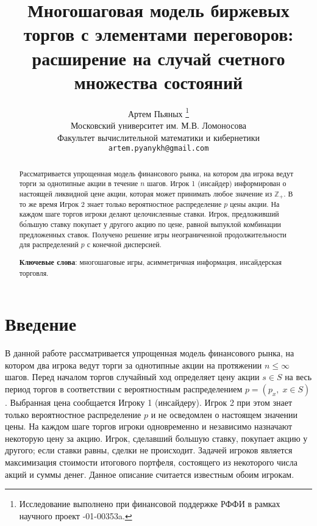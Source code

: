 \documentclass[12pt, draft]{extarticle}
\begin{document}
\title{Многошаговая модель биржевых торгов с элементами переговоров: расширение
  на случай счетного множества состояний%
}%
\author{%
  Артем Пьяных%
  \thanks{%
    Исследование выполнено при финансовой поддержке РФФИ в рамках научного
    проект -01-00353a.%
  }\\
  Московский университет им. М.В. Ломоносова\\
  Факультет вычислительной математики и кибернетики\\
  \texttt{artem.pyanykh@gmail.com}%
}%
\maketitle

\begin{abstract}
  Рассматривается упрощенная модель финансового рынка, на котором два игрока
  ведут торги за однотипные акции в течение $n$ шагов. Игрок 1 (инсайдер)
  информирован о настоящей ликвидной цене акции, которая может принимать любое
  значение из $\mathbb{Z}_+$. В то же время Игрок 2 знает только вероятностное
  распределение $p$ цены акции. На каждом шаге торгов игроки делают
  целочисленные ставки. Игрок, предложивший б\'{о}льшую ставку покупает у
  другого акцию по цене, равной выпуклой комбинации предложенных ставок.
  Получено решение игры неограниченной продолжительности для распределений $p$ с
  конечной дисперсией.

  \textbf{Ключевые слова}: многошаговые игры, асимметричная информация,
  инсайдерская торговля.
\end{abstract}

\section{Введение}
\label{sec:intro}

В данной работе рассматривается упрощенная модель финансового рынка, на котором
два игрока ведут торги за однотипные акции на протяжении $n \leqslant \infty$
шагов. Перед началом торгов случайный ход определяет цену акции $s \in S$ на
весь период торгов в соответствии с вероятностным распределением $p = (p_x, \; x
\in S)$. Выбранная цена сообщается Игроку 1 (инсайдеру). Игрок 2 при этом знает
только вероятностное распределение $p$ и не осведомлен о настоящем значении
цены. На каждом шаге торгов игроки одновременно и независимо назначают некоторую
цену за акцию. Игрок, сделавший большую ставку, покупает акцию у другого;
если ставки равны, сделки не происходит. Задачей игроков является максимизация
стоимости итогового портфеля, состоящего из некоторого числа акций и суммы
денег. Данное описание считается известным обоим игрокам.
\end{document}
